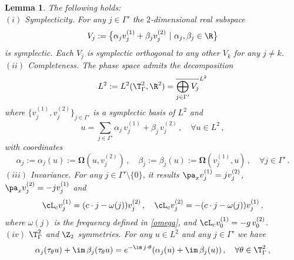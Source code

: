 \documentclass[11pt,a4paper,reqno]{article}
\numberwithin{equation}{section}
\newtheorem{lemma}[theorem]{Lemma}
\theoremstyle{definition}
\begin{document}
\begin{lemma}\label{symplectic base and coordinates}
The following holds:    
\\[1mm]
$(i)$ 
        {\sc Symplecticity.}
        For any  $ j \in \Gamma'$  
        the $ 2 $-dimensional real subspace  
\begin{equation}
\label{VJsym} V_j := \big\{ \alpha_j v_j^{(1)} + 
\beta_j v_j^{(2)} \ | \ \alpha_j, \beta_j \in \R \big\}  
\end{equation} 
is symplectic. 
Each $ V_j $ 
is symplectic orthogonal to any other $ V_k$ for any  $ j \neq k $. 
\\[1mm]
$(ii)$
        {\sc Completeness.}
        The phase space admits the decomposition 
$$ 
        L^2 := L^2 (\T^2_\Gamma, \R^2)   =  
        \overline{\bigoplus_{j \in \Gamma'}V_{j}}^{L^2}
$$ 
where   
        $\{v_j^{(1)},v_j^{(2)}\}_{j\in \Gamma'}$ is a symplectic basis  of $ L^2 $ and
\begin{equation}\label{coordiantes}
    u=\sum_{j\in \Gamma'} \alpha_j\, v_j^{(1)}+\beta_j\, v_j^{(2)}\, ,
    \quad \forall u\in L^2  \, , 
\end{equation} 
with coordinates 
        \begin{equation}
        \label{abu}
           \alpha_j := \alpha_j(u) :=  \boldsymbol{\Omega}(u,v_j^{(2)})\, , \quad  \beta_j := \beta_j (u) := \boldsymbol{\Omega}(v_j^{(1)},u) 
           \, , \quad \forall j \in \Gamma'\, .
        \end{equation}
  $(iii)$ 
        {\sc Invariance.} For any $ j \in \Gamma'\setminus\{0\}$, it results 
        $  \pa_{x} v_j^{(1)}= j v_j^{(2)} $, $ \pa_{x} v_j^{(2)} = - j v_j^{(1)} $ and 
        \begin{align}
        \label{actLc}
                \cL_c v_j^{(1)}=(c\cdot j-\omega(j)) v_j^{(2)} \, , \quad 
                \cL_c v_j^{(2)}=-(c\cdot j-\omega(j)) v_j^{(1)} \, , 
        \end{align}
where  $ \omega (j) $ is the frequency defined
in \eqref{omega}, 
        and  $\cL_c v_0^{(1)}=-g\, v_0^{(2)}$.
\\[1mm]
$(iv)$
        {\sc $ \T^2_\Gamma $ and $\Z_2$ symmetries.} For any 
        $ u \in L^2  $  and any $j \in \Gamma'$  we have
        \begin{equation}
        \label{eq:trasab}
        \begin{aligned}
            &\alpha_j (\tau_\theta u)+\im \, \beta_j (\tau_\theta u)=e^{-\im \, j \cdot \theta}(\alpha_j(u)+\im \, \beta_j(u)) \, , \quad \forall \theta\in \T^2_\Gamma \, , \\

\end{aligned}
\end{equation}
\end{lemma}
\end{document}
